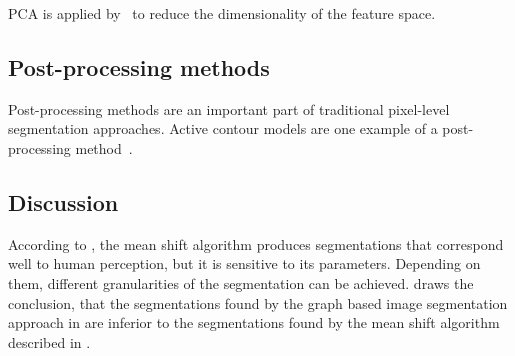 \Gls{PCA} is applied by~\cite{chen2011pixel} to reduce the dimensionality of
the feature space.

\subsection{Post-processing methods}\label{subsec:post-processing-methods}
Post-processing methods are an important part of traditional pixel-level
segmentation approaches. Active contour models are one example of a
post-processing method~\cite{kass1988snakes}.


\subsection{Discussion}\label{subsec:traditional-approaches-discussion}
According to \cite{pantofaru2005comparison}, the mean shift algorithm produces
segmentations that correspond well to human perception, but it is sensitive to
its parameters. Depending on them, different granularities of the segmentation
can be achieved. \cite{pantofaru2005comparison} draws the conclusion, that
the segmentations found by the graph based image segmentation approach
in \cite{felzenszwalb2004efficient} are inferior to the segmentations found
by the mean shift algorithm described in \cite{comaniciu2002mean}.
